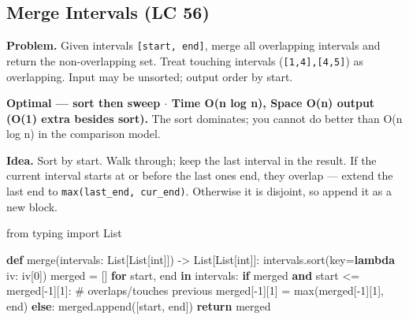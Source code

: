\documentclass[11pt]{article}
\newenvironment{Shaded}{\begin{snugshade}}{\end{snugshade}}
\newcommand{\BuiltInTok}[1]{\textcolor[rgb]{0.50,0.55,0.55}{#1}}
\newcommand{\CommentTok}[1]{\textcolor[rgb]{0.48,0.49,0.49}{#1}}
\newcommand{\ControlFlowTok}[1]{\textcolor[rgb]{0.99,0.74,0.29}{\textbf{#1}}}
\newcommand{\DecValTok}[1]{\textcolor[rgb]{0.96,0.45,0.00}{#1}}
\newcommand{\ImportTok}[1]{\textcolor[rgb]{0.15,0.68,0.38}{#1}}
\newcommand{\KeywordTok}[1]{\textcolor[rgb]{0.81,0.81,0.76}{\textbf{#1}}}
\newcommand{\NormalTok}[1]{\textcolor[rgb]{0.81,0.81,0.76}{#1}}
\newcommand{\OperatorTok}[1]{\textcolor[rgb]{0.81,0.81,0.76}{#1}}
\begin{document}
\subsection{Merge Intervals (LC 56)}\label{merge-intervals-lc-56}

\textbf{Problem.} Given intervals \texttt{{[}start,\ end{]}}, merge all overlapping intervals and return the non-overlapping set. Treat touching intervals (\texttt{{[}1,4{]},{[}4,5{]}}) as overlapping. Input may be unsorted; output order by start.

\textbf{Optimal --- sort then sweep \(\cdot\) Time O(n log n), Space O(n) output (O(1) extra besides sort).} The sort dominates; you cannot do better than O(n log n) in the comparison model.

\textbf{Idea.} Sort by start. Walk through; keep the last interval in the result. If the current interval starts at or before the last one\textquotesingle s end, they overlap --- extend the last end to \texttt{max(last\_end,\ cur\_end)}. Otherwise it is disjoint, so append it as a new block.


\begin{Shaded}
\begin{Highlighting}[]
\ImportTok{from}\NormalTok{ typing }\ImportTok{import}\NormalTok{ List}

\KeywordTok{def}\NormalTok{ merge(intervals: List[List[}\BuiltInTok{int}\NormalTok{]]) }\OperatorTok{{-}\textgreater{}}\NormalTok{ List[List[}\BuiltInTok{int}\NormalTok{]]:}
\NormalTok{    intervals.sort(key}\OperatorTok{=}\KeywordTok{lambda}\NormalTok{ iv: iv[}\DecValTok{0}\NormalTok{])}
\NormalTok{    merged }\OperatorTok{=}\NormalTok{ []}
    \ControlFlowTok{for}\NormalTok{ start, end }\KeywordTok{in}\NormalTok{ intervals:}
        \ControlFlowTok{if}\NormalTok{ merged }\KeywordTok{and}\NormalTok{ start }\OperatorTok{\textless{}=}\NormalTok{ merged[}\OperatorTok{{-}}\DecValTok{1}\NormalTok{][}\DecValTok{1}\NormalTok{]:   }\CommentTok{\# overlaps/touches previous}
\NormalTok{            merged[}\OperatorTok{{-}}\DecValTok{1}\NormalTok{][}\DecValTok{1}\NormalTok{] }\OperatorTok{=} \BuiltInTok{max}\NormalTok{(merged[}\OperatorTok{{-}}\DecValTok{1}\NormalTok{][}\DecValTok{1}\NormalTok{], end)}
        \ControlFlowTok{else}\NormalTok{:}
\NormalTok{            merged.append([start, end])}
    \ControlFlowTok{return}\NormalTok{ merged}
\end{Highlighting}
\end{Shaded}
\end{document}
